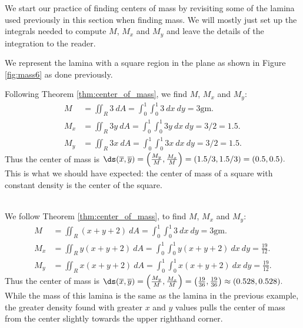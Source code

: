 We start our practice of finding centers of mass by revisiting some of the lamina used previously in this section when finding mass. We will mostly just set up the integrals needed to compute $M$, $M_x$ and $M_y$ and leave the details of the integration to the reader.\\

{We represent the lamina with a square region in the plane as shown in Figure \ref{fig:mass6} as done previously. 

Following Theorem \ref{thm:center_of_mass}, we find $M$, $M_x$ and $M_y$:
\begin{align*}
M &= \iint_R 3\ dA = \int_0^1\int_0^1 3\ dx\ dy =3\text{gm}.\\
M_x &= \iint_R 3y\ dA = \int_0^1\int_0^1 3y\ dx\ dy =3/2 = 1.5.\\
M_y &= \iint_R 3x\ dA = \int_0^1\int_0^1 3x\ dx\ dy =3/2 = 1.5.
\end{align*}
Thus the center of mass is $\ds (\overline{x},\overline{y}) = \left(\frac{M_y}M,\frac{M_x}M\right) = (1.5/3,1.5/3) = (0.5,0.5).$ This is what we should have expected: the center of mass of a square with constant density is the center of the square.
}\\

{We follow Theorem \ref{thm:center_of_mass}, to find $M$, $M_x$ and $M_y$:
\begin{align*}
M &= \iint_R (x+y+2)\ dA = \int_0^1\int_0^1 3\ dx\ dy =3\text{gm}.\\
M_x &= \iint_R y(x+y+2)\ dA = \int_0^1\int_0^1 y(x+y+2)\ dx\ dy =\frac{19}{12}.\\
M_y &= \iint_R x(x+y+2)\ dA = \int_0^1\int_0^1 x(x+y+2)\ dx\ dy =\frac{19}{12}.
\end{align*}
Thus the center of mass is $\ds (\overline{x},\overline{y}) = \left(\frac{M_y}M,\frac{M_x}M\right) = \left(\frac{19}{36},\frac{19}{36}\right) \approx (0.528,0.528).$ While the mass of this lamina is the same as the lamina in the previous example, the greater density found with greater $x$ and $y$ values pulls the center of mass from the center slightly towards the upper righthand corner.
}\\

